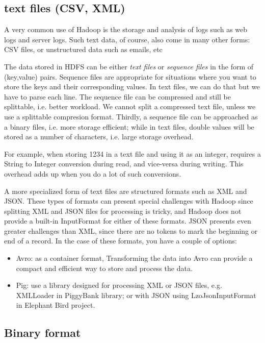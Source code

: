 \subsection{text files (CSV, XML)}

A very common use of Hadoop is the storage and analysis of logs such as web logs
and server logs. Such text data, of course, also come in many other forms: CSV
files, or unstructured data such as emails, etc 

The data stored in HDFS can be either {\it text files} or {\it sequence files}
in the form of (key,value) pairs. Sequence files are appropriate for situations
where you want to store the keys and their corresponding values. In text files,
we can do that but we have to parse each line. The sequence file can be
compressed and still be splittable, i.e. better workload. We cannot split a
compressed text file, unless we use a splittable compresion format. Thirdly, a
sequence file can be approached as a binary files, i.e. more storage efficient;
while in text files, double values will be stored as a number of characters,
i.e. large storage overhead.

For example, when storing 1234 in a text file and using it as an integer,
requires a String to Integer conversion during read, and vice-versa during
writing. This overhead adds up when you do a lot of such conversions. 

A more specialized form of text files are structured formats such as XML and
JSON. These types of formats can present special challenges with Hadoop since
splitting XML and JSON files for processing is tricky, and Hadoop does not
provide a built-in InputFormat for either of these formats. JSON presents even
greater challenges than XML, since there are no tokens to mark the beginning or
end of a record. In the case of these formats, you have a couple of options:     
\begin{itemize}
  \item Avro: as a container format, Transforming the data into Avro can provide
  a compact and efficient way to store and process the data.
  
  \item Pig: use a library designed for processing XML or JSON files, e.g.
  XMLLoader in PiggyBank library; or with JSON using LzoJsonInputFormat in
  Elephant Bird project. 
  
\end{itemize}

\subsection{Binary format}

